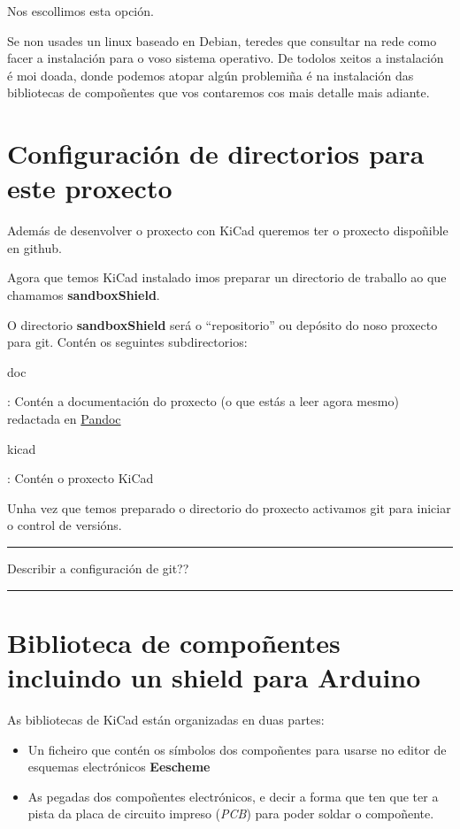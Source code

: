 Nos escollimos esta opción.

Se non usades un linux baseado en Debian, teredes que consultar na rede
como facer a instalación para o voso sistema operativo. De todolos
xeitos a instalación é moi doada, donde podemos atopar algún problemiña
é na instalación das bibliotecas de compoñentes que vos contaremos cos
mais detalle mais adiante.

\section{Configuración de directorios para este
proxecto}\label{configuraciuxf3n-de-directorios-para-este-proxecto}

Además de desenvolver o proxecto con KiCad queremos ter o proxecto
dispoñible en github.

Agora que temos KiCad instalado imos preparar un directorio de traballo
ao que chamamos \textbf{sandboxShield}.

O directorio \textbf{sandboxShield} será o ``repositorio'' ou depósito
do noso proxecto para git. Contén os seguintes subdirectorios:

doc

: Contén a documentación do proxecto (o que estás a leer agora mesmo)
redactada en \href{http://pandoc.org/}{Pandoc}

kicad

: Contén o proxecto KiCad

Unha vez que temos preparado o directorio do proxecto activamos git para
iniciar o control de versións.

\begin{center}\rule{0.5\linewidth}{\linethickness}\end{center}

Describir a configuración de git??

\begin{center}\rule{0.5\linewidth}{\linethickness}\end{center}

\section{Biblioteca de compoñentes incluindo un shield para
Arduino}\label{biblioteca-de-compouxf1entes-incluindo-un-shield-para-arduino}

As bibliotecas de KiCad están organizadas en duas partes:

\begin{itemize}
\item
  Un ficheiro que contén os símbolos dos compoñentes para usarse no
  editor de esquemas electrónicos \textbf{Eescheme}
\item
  As pegadas dos compoñentes electrónicos, e decir a forma que ten que
  ter a pista da placa de circuito impreso (\emph{PCB}) para poder
  soldar o compoñente.
\end{itemize}

